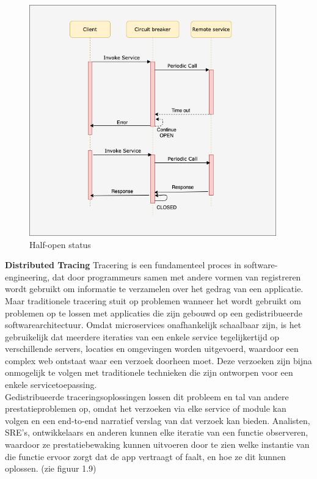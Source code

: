 \begin{figure}[!htb]
    \caption{Half-open status}
    \centering
    \includegraphics[height=10cm]{half-open.png}
\end{figure}

\textbf{Distributed Tracing}
Tracering is een fundamenteel proces in software-engineering, dat door programmeurs samen met andere vormen van registreren wordt gebruikt om informatie te verzamelen over het gedrag van een applicatie. Maar traditionele tracering stuit op problemen wanneer het wordt gebruikt om problemen op te lossen met applicaties die zijn gebouwd op een gedistribueerde softwarearchitectuur. Omdat microservices onafhankelijk schaalbaar zijn, is het gebruikelijk dat meerdere iteraties van een enkele service tegelijkertijd op verschillende servers, locaties en omgevingen worden uitgevoerd, waardoor een complex web ontstaat waar een verzoek doorheen moet. Deze verzoeken zijn bijna onmogelijk te volgen met traditionele technieken die zijn ontworpen voor een enkele servicetoepassing.
\\
Gedistribueerde traceringsoplossingen lossen dit probleem en tal van andere prestatieproblemen op, omdat het verzoeken via elke service of module kan volgen en een end-to-end narratief verslag van dat verzoek kan bieden. Analisten, SRE's, ontwikkelaars en anderen kunnen elke iteratie van een functie observeren, waardoor ze prestatiebewaking kunnen uitvoeren door te zien welke instantie van die functie ervoor zorgt dat de app vertraagt of faalt, en hoe ze dit kunnen oplossen. (zie figuur 1.9)

